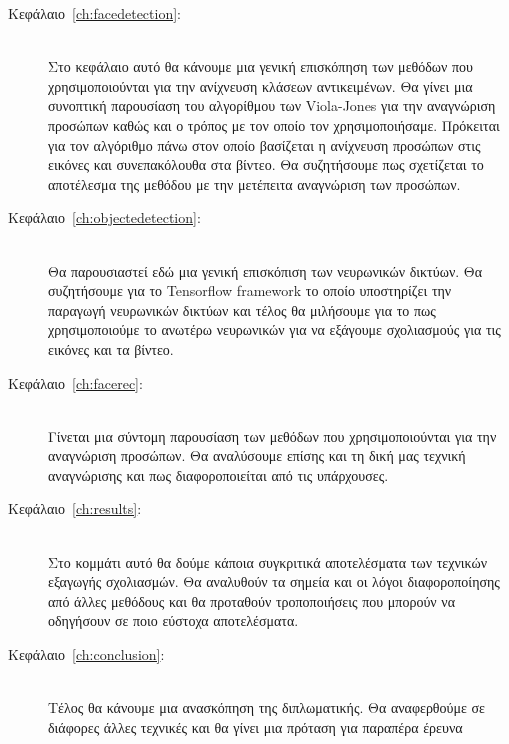 \begin{description}
  \item[Κεφάλαιο~\ref{ch:facedetection}:] \hfill \\
    Στο κεφάλαιο αυτό θα κάνουμε μια γενική επισκόπηση των μεθόδων που
    χρησιμοποιούνται για την ανίχνευση κλάσεων αντικειμένων.
    Θα γίνει μια συνοπτική παρουσίαση του αλγορίθμου των Viola-Jones για την
    αναγνώριση προσώπων καθώς
    και ο τρόπος με τον οποίο τον χρησιμοποιήσαμε. Πρόκειται για τον αλγόριθμο
    πάνω στον οποίο βασίζεται η ανίχνευση προσώπων στις εικόνες και συνεπακόλουθα
    στα βίντεο. Θα συζητήσουμε πως σχετίζεται το αποτέλεσμα της μεθόδου με
    την μετέπειτα αναγνώριση των προσώπων.
  \item[Κεφάλαιο~\ref{ch:objectedetection}:] \hfill \\
    Θα παρουσιαστεί εδώ μια γενική επισκόπιση των νευρωνικών δικτύων. Θα συζητήσουμε
    για το Tensorflow framework το οποίο υποστηρίζει την παραγωγή νευρωνικών δικτύων
    και τέλος θα μιλήσουμε για το πως χρησιμοποιούμε το ανωτέρω νευρωνικών
    για να εξάγουμε σχολιασμούς για τις εικόνες και τα βίντεο.
  \item[Κεφάλαιο~\ref{ch:facerec}:] \hfill \\
    Γίνεται μια σύντομη παρουσίαση των μεθόδων που χρησιμοποιούνται για την
    αναγνώριση προσώπων. Θα αναλύσουμε επίσης και τη δική μας τεχνική αναγνώρισης
    και πως διαφοροποιείται από τις υπάρχουσες.
  \item[Κεφάλαιο~\ref{ch:results}:] \hfill \\
    Στο κομμάτι αυτό θα δούμε κάποια συγκριτικά αποτελέσματα των τεχνικών
    εξαγωγής σχολιασμών. Θα αναλυθούν τα σημεία και οι λόγοι διαφοροποίησης
    από άλλες μεθόδους και θα προταθούν τροποποιήσεις που μπορούν να οδηγήσουν
    σε ποιο εύστοχα αποτελέσματα.
  \item[Κεφάλαιο~\ref{ch:conclusion}:] \hfill \\
    Τέλος θα κάνουμε μια ανασκόπηση της διπλωματικής. Θα αναφερθούμε σε διάφορες
    άλλες τεχνικές και θα γίνει μια πρόταση για παραπέρα έρευνα
\end{description}
